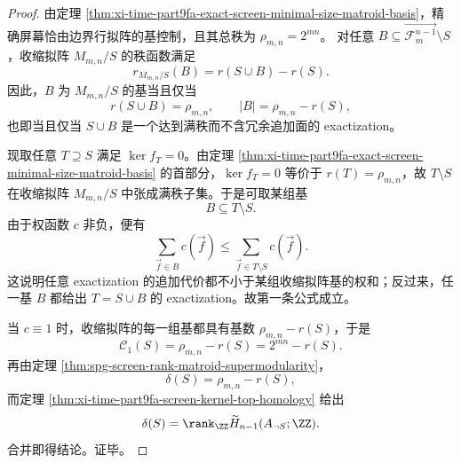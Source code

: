 \begin{proof}
由定理 \ref{thm:xi-time-part9fa-exact-screen-minimal-size-matroid-basis}，精确屏幕恰由边界行拟阵的基控制，且其总秩为
\(
\rho_{m,n}=2^{mn}
\)。
对任意 \(B\subseteq \overrightarrow{\mathcal F_m^{n-1}}\setminus S\)，收缩拟阵 \(M_{m,n}/S\) 的秩函数满足
\[
r_{M_{m,n}/S}(B)=r(S\cup B)-r(S).
\]
因此，\(B\) 为 \(M_{m,n}/S\) 的基当且仅当
\[
r(S\cup B)=\rho_{m,n},
\qquad
|B|=\rho_{m,n}-r(S),
\]
也即当且仅当 \(S\cup B\) 是一个达到满秩而不含冗余追加面的 exactization。

现取任意 \(T\supseteq S\) 满足 \(\ker f_T=0\)。由定理
\ref{thm:xi-time-part9fa-exact-screen-minimal-size-matroid-basis} 的首部分，\(\ker f_T=0\) 等价于 \(r(T)=\rho_{m,n}\)，故 \(T\setminus S\) 在收缩拟阵 \(M_{m,n}/S\) 中张成满秩子集。于是可取某组基
\[
B\subseteq T\setminus S.
\]
由于权函数 \(c\) 非负，便有
\[
\sum_{\vec f\in B}c(\vec f)\le \sum_{\vec f\in T\setminus S}c(\vec f).
\]
这说明任意 exactization 的追加代价都不小于某组收缩拟阵基的权和；反过来，任一基 \(B\) 都给出 \(T=S\cup B\) 的 exactization。故第一条公式成立。

当 \(c\equiv 1\) 时，收缩拟阵的每一组基都具有基数
\(
\rho_{m,n}-r(S)
\)，于是
\[
\mathcal C_1(S)=\rho_{m,n}-r(S)=2^{mn}-r(S).
\]
再由定理 \ref{thm:spg-screen-rank-matroid-supermodularity}，
\[
\delta(S)=\rho_{m,n}-r(S),
\]
而定理 \ref{thm:xi-time-part9fa-screen-kernel-top-homology} 给出
\[
\delta(S)=\rank_{\ZZ}\widetilde H_{n-1}(A_{\neg S};\ZZ).
\]
合并即得结论。证毕。
\end{proof}

